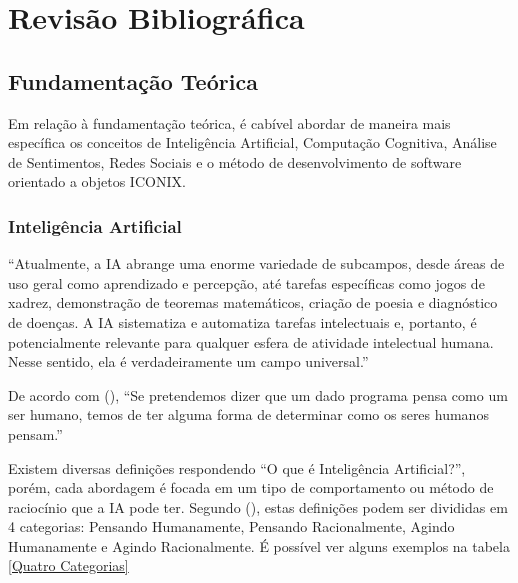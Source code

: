 \documentclass[
	12pt,				%
	openright,			%
	oneside,			%
	a4paper,			%
	english,			%
	spanish,			%
	brazil				%
	]{abntex2}
\begin{document}
\chapter{Revisão Bibliográfica}				


\section{Fundamentação Teórica}
	
	Em relação à fundamentação teórica, é cabível abordar de maneira mais específica os conceitos de Inteligência Artificial, Computação Cognitiva, Análise de Sentimentos, Redes Sociais e o método de desenvolvimento de software orientado a objetos ICONIX.

	\subsection{Inteligência Artificial}	
	\begin{citacao} ``Atualmente, a IA abrange uma enorme variedade de subcampos, desde áreas de uso geral como aprendizado e percepção, até tarefas específicas como jogos de xadrez, demonstração de teoremas matemáticos, criação de poesia e diagnóstico de doenças. A IA sistematiza e automatiza tarefas intelectuais e, portanto, é potencialmente relevante para qualquer esfera de atividade intelectual humana. Nesse sentido, ela é verdadeiramente um campo universal.'' \cite{norvig}
	\end{citacao}

	De acordo com  (\citeyear{norvig}), ``Se pretendemos dizer que um dado programa pensa como um ser humano, temos de ter alguma forma de determinar como os seres humanos pensam.''
	
	Existem diversas definições respondendo ``O que é Inteligência Artificial?'', porém, cada abordagem é focada em um tipo de comportamento ou método de raciocínio que a IA pode ter. Segundo  (\citeyear{norvig}), estas definições podem ser divididas em 4 categorias: Pensando Humanamente, Pensando Racionalmente, Agindo Humanamente e Agindo Racionalmente. É possível ver alguns exemplos na tabela \ref{Quatro Categorias}
	
\end{document}
